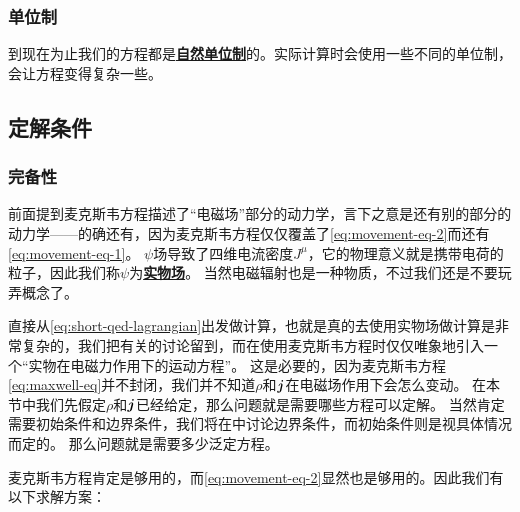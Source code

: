 \documentclass[UTF8, a4paper]{ctexart}
\newcommand*{\concept}[1]{\underline{\textbf{#1}}}
\begin{document}
\subsubsection{单位制}\label{sec:unit-system}

到现在为止我们的方程都是\concept{自然单位制}的。实际计算时会使用一些不同的单位制，会让方程变得复杂一些。


\subsection{定解条件}

\subsubsection{完备性}\label{sec:completeness}

前面提到麦克斯韦方程描述了“电磁场”部分的动力学，言下之意是还有别的部分的动力学——的确还有，因为麦克斯韦方程仅仅覆盖了\eqref{eq:movement-eq-2}而还有\eqref{eq:movement-eq-1}。
$\psi$场导致了四维电流密度$J^\mu$，它的物理意义就是携带电荷的粒子，因此我们称$\psi$为\concept{实物场}。
当然电磁辐射也是一种物质，不过我们还是不要玩弄概念了。

直接从\eqref{eq:short-qed-lagrangian}出发做计算，也就是真的去使用实物场做计算是非常复杂的，我们把有关的讨论留到，而在使用麦克斯韦方程时仅仅唯象地引入一个“实物在电磁力作用下的运动方程”。
这是必要的，因为麦克斯韦方程\eqref{eq:maxwell-eq}并不封闭，我们并不知道$\rho$和$\vb*{j}$在电磁场作用下会怎么变动。
在本节中我们先假定$\rho$和$\vb*{j}$已经给定，那么问题就是需要哪些方程可以定解。
当然肯定需要初始条件和边界条件，我们将在中讨论边界条件，而初始条件则是视具体情况而定的。
那么问题就是需要多少泛定方程。

麦克斯韦方程肯定是够用的，而\eqref{eq:movement-eq-2}显然也是够用的。因此我们有以下求解方案：
\end{document}
